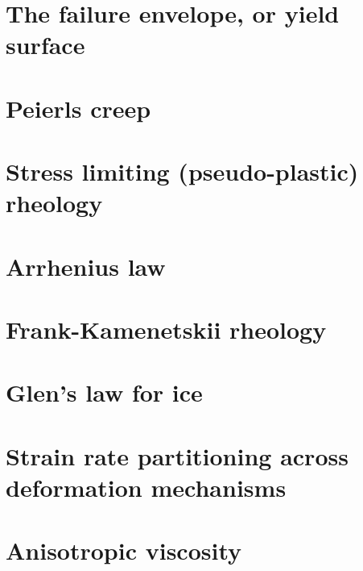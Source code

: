 \section{The failure envelope, or yield surface \label{ss:envelope}}


\section{Peierls creep}


\section{Stress limiting (pseudo-plastic) rheology}


\section{Arrhenius law} 


\section{Frank-Kamenetskii rheology}


\section{Glen's law for ice}\label{ss:glen}


\section{Strain rate partitioning across deformation mechanisms}\label{ss:srpart}


\section{Anisotropic viscosity}


